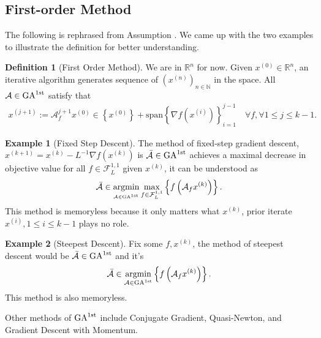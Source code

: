 \documentclass[]{article}
\theoremstyle{definition}
\newtheorem{definition}{Definition}
\newtheorem{exmp}{Example}[section]
\numberwithin{equation}{subsection}
\begin{document}
    \subsection{First-order Method}
        The following is rephrased from Assumption \cite[2.1.4]{nesterov_lecture_2018}. 
        We came up with the two examples to illustrate the definition for better understanding. 
        \begin{definition}[First Order Method]
            We are in $\mathbb R^n$ for now. Given $x^{(0)} \in \mathbb R^n$, an iterative algorithm generates sequence of $\left(x^{(n)}\right)_{n \in \mathbb N}$ in the space. All $\mathcal A \in \text{GA}^{\text{1st}}$ satisfy that 
            \begin{align*}
                 x^{(j + 1)}:= \mathcal A_f^{j + 1}x^{(0)} \in \left\{x^{(0)}\right\} + 
                \text{span}\left\{\nabla f\left(x^{(i)}\right)\right\}_{i = 1}^{j - 1} \quad \forall f, \forall 1\le j \le k -1. 
            \end{align*}
        \end{definition}
        \begin{exmp}[Fixed Step Descent]
            The method of fixed-step gradient descent, $x^{(k + 1)} = x^{(k)} - L^{-1}\nabla f(x^{(k)})$ is $ \bar {\mathcal A}\in \text{GA}^{\text{1st}}$ achieves a maximal decrease in objective value for all $f\in \mathcal F_{L}^{1, 1}$ given $x^{(k)}$, it can be understood as 
            \[
                \bar {\mathcal A} \in 
                \underset{_{\mathcal A\in \text{GA}^{\text{1st}}}}{\text{argmin}}
                \max_{f\in \mathcal F_L^{1, 1}} \left\lbrace
                    f\left(
                        \mathcal A_f x^{(k)}
                    \right)
                \right\rbrace. 
            \]
            This method is memoryless because it only matters what $x^{(k)}$, prior iterate $x^{(i)}, 1\le i \le k-1$ plays no role. 
        \end{exmp}
        \begin{exmp}[Steepest Descent]
            Fix some $f, x^{(k)}$, the method of steepest descent would be $\bar {\mathcal A}\in \text{GA}^{\text{1st}}$ and it's 
            \[
                \bar {\mathcal A}\in  \underset{\mathcal A \in \text{GA}^{\text{1st}}}{\text{argmin}}
                \left\lbrace
                    f\left(
                        \mathcal A_f x^{(k)}
                    \right)
                \right\rbrace. 
            \]
            This method is also memoryless.     
        \end{exmp}
        Other methods of $\text{GA}^{\text{1st}}$ include Conjugate Gradient, Quasi-Newton, and Gradient Descent with Momentum. 
\end{document}
